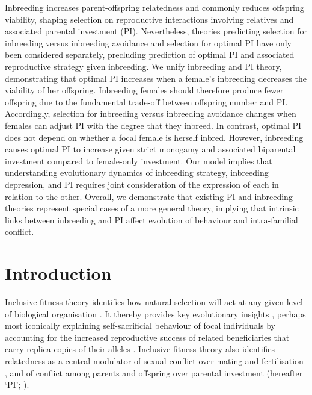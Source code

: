 \documentclass[12pt]{article}
\begin{document}
Inbreeding increases parent-offspring relatedness and commonly reduces offspring viability, shaping selection on reproductive interactions involving relatives and associated parental investment (PI). Nevertheless, theories predicting selection for inbreeding versus inbreeding avoidance and selection for optimal PI have only been considered separately, precluding prediction of optimal PI and associated reproductive strategy given inbreeding. We unify inbreeding and PI theory, demonstrating that optimal PI increases when a female's inbreeding decreases the viability of her offspring. Inbreeding females should therefore produce fewer offspring due to the fundamental trade-off between offspring number and PI. Accordingly, selection for inbreeding versus inbreeding avoidance changes when females can adjust PI with the degree that they inbreed. In contrast, optimal PI does not depend on whether a focal female is herself inbred. However, inbreeding causes optimal PI to increase given strict monogamy and associated biparental investment compared to female-only investment. Our model implies that understanding evolutionary dynamics of inbreeding strategy, inbreeding depression, and PI requires joint consideration of the expression of each in relation to the other. Overall, we demonstrate that existing PI and inbreeding theories represent special cases of a more general theory, implying that intrinsic links between inbreeding and PI affect evolution of behaviour and intra-familial conflict.


\section*{Introduction}

Inclusive fitness theory identifies how natural selection will act at any given level of biological organisation \cite[][]{Grafen2006}. It thereby provides key evolutionary insights \cite[][]{Fisher2013, Bourke2014, Gardner2014, Liao2015}, perhaps most iconically explaining self-sacrificial behaviour of focal individuals by accounting for the increased reproductive success of related beneficiaries that carry replica copies of their alleles \cite[][]{Hamilton1964, Hamilton1964a, Frank2013}. Inclusive fitness theory also identifies relatedness as a central modulator of sexual conflict over mating and fertilisation \cite[][]{Parker2006}, and of conflict among parents and offspring over parental investment (hereafter `PI'; \cite[][]{Trivers1972, Trivers1974, Kolliker2015}). 
\end{document}
